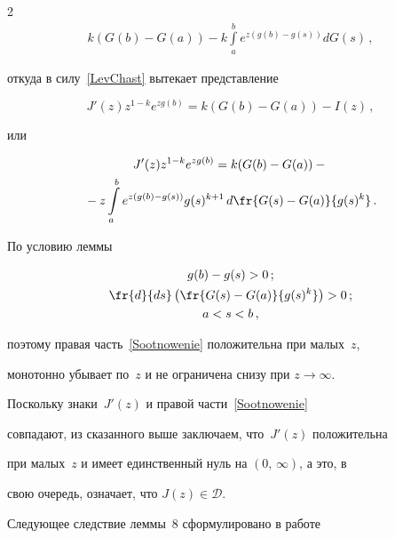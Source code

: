 \begin{multicols}{2}
\begin{multline*}
k(G(b)-G(a))-k\int\limits_a^b{e^{z(g(b)-g(s))}dG(s)}\,,


\end{multline*}


откуда в силу~\eqref{LevChast} вытекает представление


$$


J'(z)z^{1-k}e^{zg(b)}= k(G(b)-G(a))-I(z)\,,


$$


или


\begin{multline}


J'(z)z^{1-k}e^{zg(b)} =k(G(b)-G(a))-{}\\


{}-


z\int\limits_a^b{e^{z(g(b)-g(s))}g(s)^{k+1}\,


d\fr{G(s)-G(a)}{g(s)^k}}\,.


\label{Sootnowenie}


\end{multline}


По условию леммы


\begin{gather*}


g(b)-g(s)>0\,;\\


\fr{d}{ds}\left(\fr{G(s)-G(a)}{g(s)^k}\right)>0\,;\\ 




a< s< b\,,


\end{gather*}


поэтому правая часть~\eqref{Sootnowenie} положительна при малых~$z$,


монотонно убывает по~$z$ и не ограничена снизу при $z\to\infty$.


Поскольку знаки~$J'(z)$ и правой части~\eqref{Sootnowenie}


совпадают, из сказанного выше заключаем, что~$J'(z)$ положительна


при малых~$z$ и имеет единственный нуль на $(0,\,\infty)$, а это, в


свою очередь, означает, что $J(z)\in \mathcal D.$





\smallskip





Следующее следствие леммы~8 сформулировано в работе



\end{multicols}

